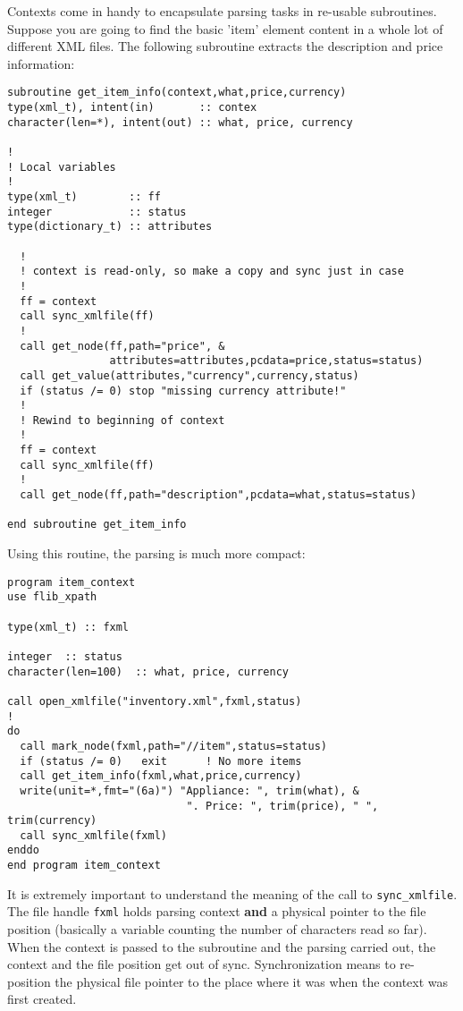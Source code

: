 \documentclass[11pt]{article}
\begin{document}
Contexts come in handy to encapsulate parsing tasks in re-usable
subroutines. Suppose you are going to find the basic 'item' element
content in a whole lot of different XML files. The following
subroutine extracts the description and price information:
%
\begin{verbatim}
subroutine get_item_info(context,what,price,currency)
type(xml_t), intent(in)       :: contex
character(len=*), intent(out) :: what, price, currency

!
! Local variables
!
type(xml_t)        :: ff
integer            :: status
type(dictionary_t) :: attributes

  ! 
  ! context is read-only, so make a copy and sync just in case
  !
  ff = context
  call sync_xmlfile(ff)  
  !
  call get_node(ff,path="price", &
                attributes=attributes,pcdata=price,status=status)
  call get_value(attributes,"currency",currency,status)
  if (status /= 0) stop "missing currency attribute!"
  !
  ! Rewind to beginning of context
  !
  ff = context
  call sync_xmlfile(ff)  
  !
  call get_node(ff,path="description",pcdata=what,status=status)

end subroutine get_item_info
\end{verbatim}
%
Using this routine, the parsing is much more compact:
%
\begin{verbatim}
program item_context
use flib_xpath

type(xml_t) :: fxml

integer  :: status
character(len=100)  :: what, price, currency

call open_xmlfile("inventory.xml",fxml,status)
!
do
  call mark_node(fxml,path="//item",status=status)
  if (status /= 0)   exit      ! No more items
  call get_item_info(fxml,what,price,currency)
  write(unit=*,fmt="(6a)") "Appliance: ", trim(what), &
                            ". Price: ", trim(price), " ", trim(currency)
  call sync_xmlfile(fxml)
enddo
end program item_context
\end{verbatim}
%
It is extremely important to understand the meaning of the call to
\texttt{sync\_xmlfile}. The file handle \texttt{fxml} holds parsing
context \textbf{and} a physical pointer to the file position
(basically a variable counting the number of characters read so
far). When the context is passed to the subroutine and the parsing
carried out, the context and the file position get out of
sync. Synchronization means to re-position the physical file pointer
to the place where it was when the context was first created.
\end{document}
